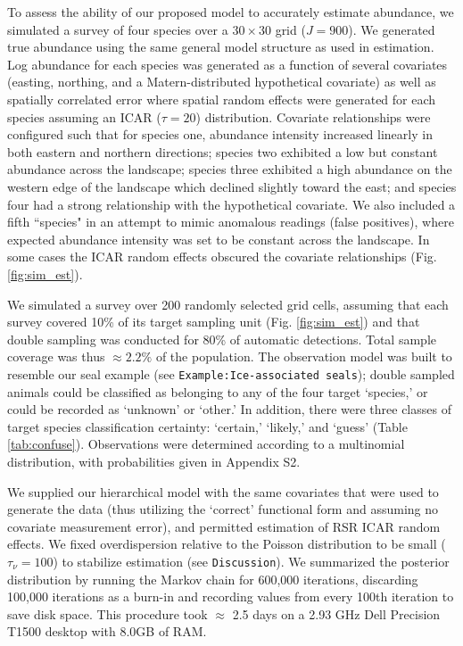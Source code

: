 \documentclass[12pt,fleqn]{article}
\begin{document}
\begin{flushleft}
To assess the ability of our proposed model to accurately estimate abundance, we simulated a survey
of four species over a $30 \times 30$ grid ($J=900$).  We generated true abundance using the same general model structure
as used in estimation.  Log abundance for each species was generated as a function of several covariates (easting, northing, and a Matern-distributed hypothetical covariate) as well as spatially correlated error where spatial random effects were generated for each species assuming an ICAR ($\tau=20$) distribution.  Covariate relationships were configured such that for species one, abundance intensity increased linearly in both eastern and northern directions; species two exhibited a low but constant abundance across the landscape; species three exhibited a high abundance on the western edge of the landscape which declined slightly toward the east; and species four had a strong relationship with the hypothetical covariate.  We also included a fifth ``species" in an attempt to mimic anomalous readings (false positives), where expected abundance intensity was  set to be constant across the landscape.  In some cases the ICAR random effects obscured the covariate relationships (Fig. \ref{fig:sim_est}).

\hspace{.5in}We simulated a survey over 200 randomly selected grid cells, assuming that each survey covered 10\% of its target sampling unit (Fig. \ref{fig:sim_est}) and that double sampling was conducted for 80\% of automatic detections.  Total sample coverage was thus $\approx 2.2\%$ of the population. The observation model was built to resemble our seal example (see \texttt{Example:Ice-associated seals}); double sampled animals could be classified as belonging to any of the four target `species,' or could be recorded as `unknown' or `other.'  In addition, there were three classes of target species classification certainty: `certain,' `likely,' and `guess' (Table \ref{tab:confuse}).  Observations were determined according to a multinomial distribution, with probabilities given in Appendix S2.

\hspace{.5in}We supplied our hierarchical model with the same covariates that were used to generate the data (thus utilizing the `correct' functional form and assuming no covariate measurement error), and permitted estimation of RSR ICAR random effects.  We fixed overdispersion relative to the Poisson distribution to be small ($\tau_\nu = 100$) to stabilize estimation (see \texttt{Discussion}).  We summarized the posterior distribution by running the Markov chain for 600,000 iterations, discarding 100,000 iterations as a burn-in and recording values from every 100th iteration to save disk space.  This procedure took $\approx$ 2.5 days on a 2.93 GHz Dell Precision T1500 desktop with 8.0GB of RAM.



\end{flushleft}
\end{document}
